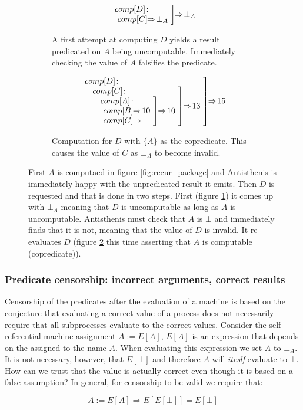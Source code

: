 \begin{figure}[H]
  \begin{subfigure}{0.4\linewidth}
    \[
      \comp{\bot_A}{D}{comp[C] \ev \bot_A}
    \]
    \caption{\label{fig:compdnaive}A first attempt at computing \(D\)
      yields a result predicated on \(A\) being
      uncomputable. Immediately checking the value of \(A\) falsifies
      the predicate.}
  \end{subfigure}
  \begin{subfigure}{0.4\linewidth}
    \[
    \comp{15}{D}{
      \comp{13}{C}{
        \comp{10}{A}{
          comp[B] \ev 10 \\
          \ comp[C] \ev \bot}}}
  \]
  \caption{\label{fig:compdsmart}Computation for \(D\) with \(\{A\}\)
    as the copredicate. This causes the value of \(C\) as \(\bot_A\)
    to become invalid.}
  \end{subfigure}
  \caption{\label{fig:correct} First \(A\) is computaed in figure
    \ref{fig:recur_package} and Antisthenis is immediately happy with
    the unpredicated result it emits. Then \(D\) is requested and that
    is done in two steps. First (figure \ref{fig:compdnaive}) it comes
    up with \(\bot_A\) meaning that \(D\) is uncomputable as long as
    \(A\) is uncomputable. Antisthenis must check that \(A\) is
    \(\bot\) and immediately finds that it is not, meaning that the
    value of \(D\) is invalid. It re-evaluates \(D\) (figure
    \ref{fig:compdsmart} this time asserting that \(A\) is computable
    (copredicate)).}
\end{figure}

\subsubsection{Predicate censorship: incorrect arguments, correct
  results}

Censorship of the predicates after the evaluation of a machine is
based on the conjecture that evaluating a correct value of a process
does not necessarily require that all subprocesses evaluate to the
correct values. Consider the self-referential machine assignment \(A :=
E[A]\), \(E[A]\) is an expression that depends on the assigned to the
name \(A\). When evaluating this expression we set \(A\) to
\(\bot_A\). It is not necessary, however, that \(E[\bot]\) and
therefore \(A\) will \emph{iteslf} evaluate to \(\bot\). How can we trust
that the value is actually correct even though it is based on a false
assumption? In general, for censorship to be valid we require that:

\[
A := E[A] \Rightarrow E[E[\bot]] = E[\bot]
\]


